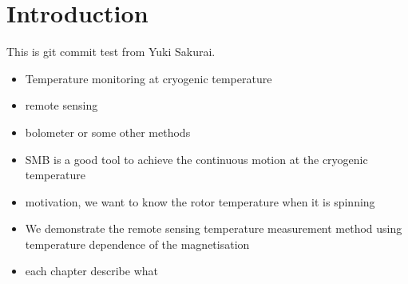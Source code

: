 \section{Introduction}
This is git commit test from Yuki Sakurai.
\begin{itemize}
\item Temperature monitoring at cryogenic temperature
\item remote sensing
\item bolometer or some other methods
\item SMB is a good tool to achieve the continuous motion at the cryogenic temperature
\item motivation, we want to know the rotor temperature when it is spinning
\item We demonstrate the remote sensing temperature measurement method using temperature dependence of the magnetisation
\item each chapter describe what
\end{itemize}
